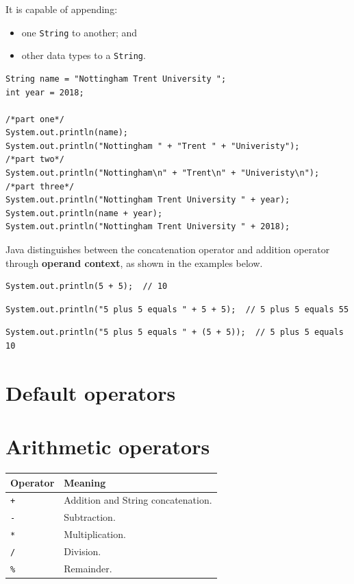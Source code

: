 \documentclass[a4paper]{systems-software}
\begin{document}
It is capable of appending:
\begin{itemize}
	\item one \texttt{String} to another; and
	\item other data types to a \texttt{String}.
\end{itemize}

\begin{lstlisting}[title={Conatenating Strings.}]
String name = "Nottingham Trent University ";
int year = 2018;

/*part one*/
System.out.println(name);
System.out.println("Nottingham " + "Trent " + "Univeristy");
/*part two*/
System.out.println("Nottingham\n" + "Trent\n" + "Univeristy\n");
/*part three*/
System.out.println("Nottingham Trent University " + year);
System.out.println(name + year);
System.out.println("Nottingham Trent University " + 2018);
\end{lstlisting}

Java distinguishes between the concatenation operator and addition operator through \textbf{operand context}, as shown in the examples below.

\begin{lstlisting}[title={Conatenating integers}]
System.out.println(5 + 5);  // 10
\end{lstlisting}

\begin{lstlisting}[title={Conatenating integers and Strings}]
System.out.println("5 plus 5 equals " + 5 + 5);  // 5 plus 5 equals 55
\end{lstlisting}


\begin{lstlisting}[title={Conatenating integers and Strings}]
System.out.println("5 plus 5 equals " + (5 + 5));  // 5 plus 5 equals 10
\end{lstlisting}


\section{Default operators}

\section*{Arithmetic operators}

\begin{longtabu} to \textwidth {| X[0.15,l] | X[1,l] |}
	\hline
	\textbf{Operator} & \textbf{Meaning}
	\\ \hline
	\texttt{+} & Addition and String concatenation.
	\\ \hline
	\texttt{-} & Subtraction.
	\\ \hline
	\texttt{*} & Multiplication.
	\\ \hline
	\texttt{/} & Division.
	\\ \hline
	\texttt{\%} & Remainder.
	\\ \hline
\end{longtabu}
\end{document}
